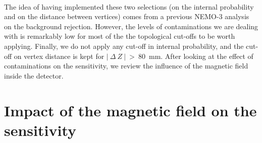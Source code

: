 \paragraph{}The idea of having implemented these two selections (on the internal probability and on the distance between vertices) comes from a previous NEMO-$3$ analysis on the background rejection.
However, the levels of contaminations we are dealing with is remarkably low for most of the the topological cut-offs to be worth applying.
Finally, we do not apply any cut-off in internal probability, and the cut-off on vertex distance is kept for $|~\Delta~Z~|~>~80$~mm.
After looking at the effect of contaminations on the sensitivity, we review the influence of the magnetic field inside the detector.

\section{Impact of the magnetic field on the sensitivity}
\label{sec:magnetic_field}


